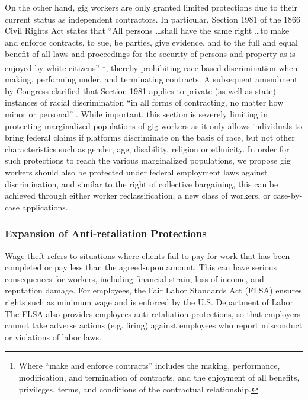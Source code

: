 On the other hand, gig workers are only granted limited protections due to their current status as independent contractors. In particular, Section 1981 of the 1866 Civil Rights Act states that ``All persons \dots shall have the same right \dots to make and enforce contracts, to sue, be parties, give evidence, and to the full and equal benefit of all laws and proceedings for the security of persons and property as is enjoyed by white citizens'' \footnote{Where ``make and enforce contracts'' includes the making, performance, modification, and termination of contracts, and the enjoyment of all benefits, privileges, terms, and conditions of the contractual relationship.}, thereby prohibiting race-based discrimination when making, performing under, and terminating contracts. A subsequent amendment by Congress clarified that Section 1981 applies to private (as well as state) instances of racial discrimination ``in all forms of contracting, no matter how minor or personal'' \cite{Leong2016-eb}. While important, this section is severely limiting in protecting marginalized populations of gig workers as it only allows individuals to bring federal claims if platforms discriminate on the basis of race, but not other characteristics such as gender, age, disability, religion or ethnicity. In order for such protections to reach the various marginalized populations, we propose gig workers should also be protected under federal employment laws against discrimination, and similar to the right of collective bargaining, this can be achieved through either worker reclassification, a new class of workers, or case-by-case applications.

\subsubsection{Expansion of Anti-retaliation Protections}
Wage theft refers to situations where clients fail to pay for work that has been completed or pay less than the agreed-upon amount. This can have serious consequences for workers, including financial strain, loss of income, and reputation damage. For employees, the Fair Labor Standards Act (FLSA) ensures rights such as minimum wage and is enforced by the U.S. Department of Labor \cite{flsa}. The FLSA also provides employees anti-retaliation protections, so that employers cannot take adverse actions (e.g. firing) against employees who report misconduct or violations of labor laws. 

